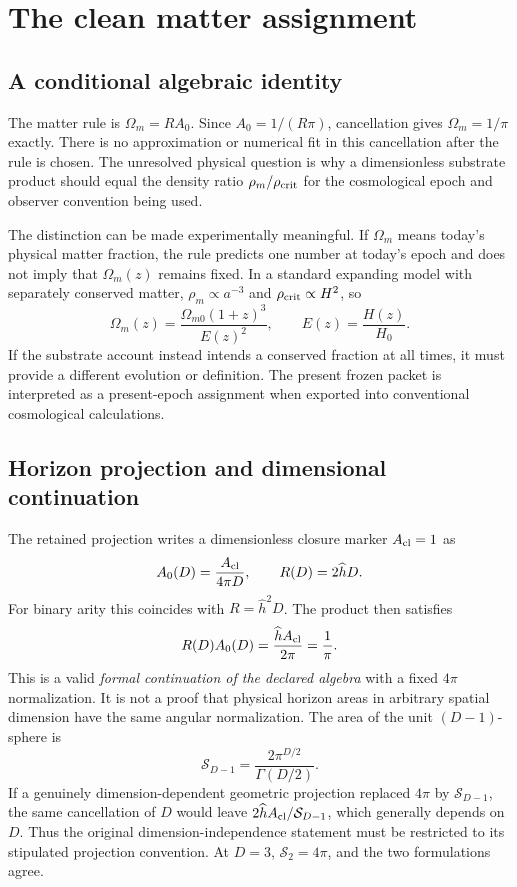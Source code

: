 \section{The clean matter assignment}
\subsection{A conditional algebraic identity}
The matter rule is $\Omega_m=RA_0$. Since $A_0=1/(R\pi)$, cancellation gives $\Omega_m=1/\pi$ exactly. There is no approximation or numerical fit in this cancellation after the rule is chosen. The unresolved physical question is why a dimensionless substrate product should equal the density ratio $\rho_m/\rho_{\rm crit}$ for the cosmological epoch and observer convention being used.

The distinction can be made experimentally meaningful. If $\Omega_m$ means today's physical matter fraction, the rule predicts one number at today's epoch and does not imply that $\Omega_m(z)$ remains fixed. In a standard expanding model with separately conserved matter, $\rho_m\propto a^{-3}$ and $\rho_{\rm crit}\propto H^2$, so
\begin{equation}
 \Omega_m(z)=\frac{\Omega_{m0}(1+z)^3}{E(z)^2},
 \qquad E(z)=\frac{H(z)}{H_0}.
 \label{c8:omegaevolution}
\end{equation}
If the substrate account instead intends a conserved fraction at all times, it must provide a different evolution or definition. The present frozen packet is interpreted as a present-epoch assignment when exported into conventional cosmological calculations.

\subsection{Horizon projection and dimensional continuation}
The retained projection writes a dimensionless closure marker $A_{\rm cl}=1$ as
\begin{equation}
 A_0(D)=\frac{A_{\rm cl}}{4\pi D},\qquad
 R(D)=2\widehat hD.
 \label{c8:projection}
\end{equation}
For binary arity this coincides with $R=\widehat h^2D$. The product then satisfies
\begin{equation}
 R(D)A_0(D)=\frac{\widehat hA_{\rm cl}}{2\pi}
 =\frac1\pi.
 \label{c8:formalD}
\end{equation}
This is a valid \emph{formal continuation of the declared algebra} with a fixed $4\pi$ normalization. It is not a proof that physical horizon areas in arbitrary spatial dimension have the same angular normalization. The area of the unit $(D-1)$-sphere is
\begin{equation}
 \mathcal S_{D-1}=\frac{2\pi^{D/2}}{\Gamma(D/2)}.
 \label{c8:solidangle}
\end{equation}
If a genuinely dimension-dependent geometric projection replaced $4\pi$ by $\mathcal S_{D-1}$, the same cancellation of $D$ would leave $2\widehat hA_{\rm cl}/\mathcal S_{D-1}$, which generally depends on $D$. Thus the original dimension-independence statement must be restricted to its stipulated projection convention. At $D=3$, $\mathcal S_2=4\pi$, and the two formulations agree.

